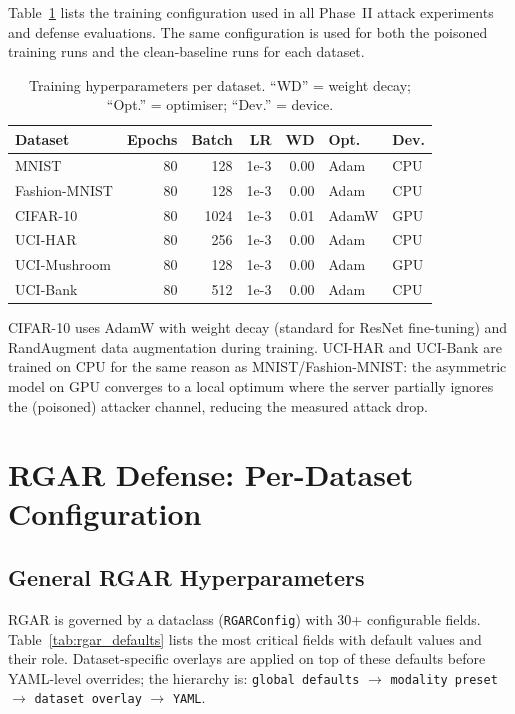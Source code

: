 \documentclass{article}
\begin{document}
Table~\ref{tab:train_hyper} lists the training configuration used in all
Phase~II attack experiments and defense evaluations.
The same configuration is used for both the poisoned training runs and the
clean-baseline runs for each dataset.

\begin{table}[h]
\centering
\caption{Training hyperparameters per dataset. ``WD'' = weight decay;
  ``Opt.'' = optimiser; ``Dev.'' = device.}
\label{tab:train_hyper}
\small
\setlength{\tabcolsep}{4pt}
\begin{tabular}{l r r r r l l}
\toprule
\textbf{Dataset} & \textbf{Epochs} & \textbf{Batch} & \textbf{LR}
  & \textbf{WD} & \textbf{Opt.} & \textbf{Dev.} \\
\midrule
MNIST          & 80  & 128   & 1e-3 & 0.00  & Adam  & CPU \\
Fashion-MNIST  & 80  & 128   & 1e-3 & 0.00  & Adam  & CPU \\
CIFAR-10       & 80  & 1024  & 1e-3 & 0.01  & AdamW & GPU \\
UCI-HAR        & 80  & 256   & 1e-3 & 0.00  & Adam  & CPU \\
UCI-Mushroom   & 80  & 128   & 1e-3 & 0.00  & Adam  & GPU \\
UCI-Bank       & 80  & 512   & 1e-3 & 0.00  & Adam  & CPU \\
\bottomrule
\end{tabular}
\end{table}

CIFAR-10 uses AdamW with weight decay (standard for ResNet fine-tuning)
and RandAugment data augmentation during training.
UCI-HAR and UCI-Bank are trained on CPU for the same reason as
MNIST/Fashion-MNIST: the asymmetric model on GPU converges to a local
optimum where the server partially ignores the (poisoned) attacker channel,
reducing the measured attack drop.

\section{RGAR Defense: Per-Dataset Configuration}
\label{app:rgar_config}

\subsection{General RGAR Hyperparameters}

RGAR is governed by a dataclass (\texttt{RGARConfig}) with 30+ configurable
fields.
Table~\ref{tab:rgar_defaults} lists the most critical fields with default
values and their role.
Dataset-specific overlays are applied on top of these defaults before
YAML-level overrides; the hierarchy is:
\texttt{global defaults} $\to$ \texttt{modality preset} $\to$ \texttt{dataset overlay} $\to$ \texttt{YAML}.
\end{document}

